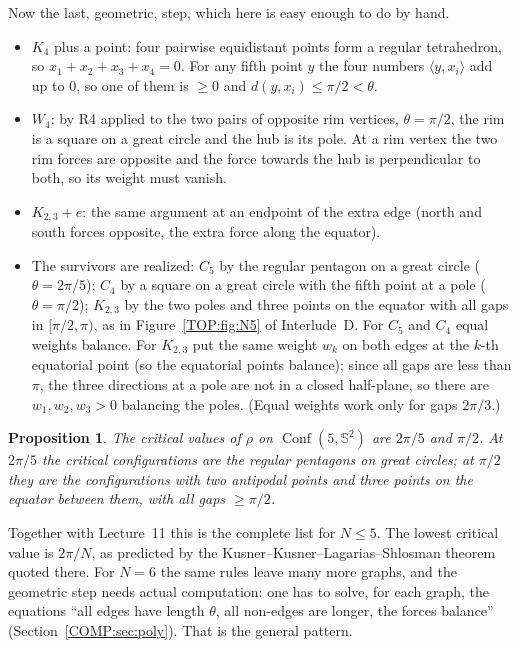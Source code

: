 \documentclass[11pt,openany]{book}
\theoremstyle{plain}
\newtheorem{proposition}[theorem]{Proposition}
\theoremstyle{definition}
\theoremstyle{remark}
\newcommand{\Sph}{\mathbb{S}}          %
\newcommand{\Conf}{\operatorname{Conf}}
\newcommand{\ip}[2]{\langle #1, #2\rangle}
\begin{document}
Now the last, geometric, step, which here is easy enough to do by hand.
\begin{itemize}
\item $K_4$ plus a point: four pairwise equidistant points form a regular tetrahedron, so
  $x_1+x_2+x_3+x_4=0$. For any fifth point $y$ the four numbers $\ip y{x_i}$ add up to $0$, so one of them is
  $\ge0$ and $d(y,x_i)\le\pi/2<\theta$.
\item $W_4$: by R4 applied to the two pairs of opposite rim vertices, $\theta=\pi/2$, the rim is a square on a
  great circle and the hub is its pole. At a rim vertex the two rim forces are opposite and the force
  towards the hub is perpendicular to both, so its weight must vanish.
\item $K_{2,3}+e$: the same argument at an endpoint of the extra edge (north and south forces opposite, the
  extra force along the equator).
\item The survivors are realized: $C_5$ by the regular pentagon on a great circle ($\theta=2\pi/5$); $C_4$
  by a square on a great circle with the fifth point at a pole ($\theta=\pi/2$); $K_{2,3}$ by the two
  poles and three points on the equator with all gaps in $[\pi/2,\pi)$, as in Figure~\ref{TOP:fig:N5} of
  Interlude~D. For $C_5$ and $C_4$ equal weights balance. For $K_{2,3}$ put the same weight $w_k$ on both
  edges at the $k$-th equatorial point (so the equatorial points balance); since all gaps are less than
  $\pi$, the three directions at a pole are not in a closed half-plane, so there are $w_1,w_2,w_3>0$
  balancing the poles. (Equal weights work only for gaps $2\pi/3$.)
\end{itemize}

\begin{proposition}\label{COMP:prop:N5}
The critical values of $\rho$ on $\Conf(5,\Sph^2)$ are $2\pi/5$ and $\pi/2$. At $2\pi/5$ the critical
configurations are the regular pentagons on great circles; at $\pi/2$ they are the configurations with
two antipodal points and three points on the equator between them, with all gaps $\ge\pi/2$.
\end{proposition}

Together with Lecture~11 this is the complete list for $N\le5$. The lowest critical value is $2\pi/N$,
as predicted by the Kusner--Kusner--Lagarias--Shlosman theorem quoted there. For $N=6$ the same rules
leave many more graphs, and the geometric step needs actual computation: one has to solve, for each
graph, the equations ``all edges have length $\theta$, all non-edges are longer, the forces balance''
(Section~\ref{COMP:sec:poly}). That is the general pattern.
\end{document}
